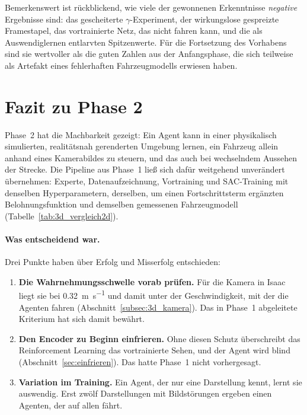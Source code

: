 Bemerkenswert ist rückblickend, wie viele der gewonnenen Erkenntnisse \emph{negative} Ergebnisse sind: das gescheiterte $\gamma$-Experiment, der wirkungslose gespreizte Framestapel, das vortrainierte Netz, das nicht fahren kann, und die als Auswendiglernen entlarvten Spitzenwerte. Für die Fortsetzung des Vorhabens sind sie wertvoller als die guten Zahlen aus der Anfangsphase, die sich teilweise als Artefakt eines fehlerhaften Fahrzeugmodells erwiesen haben.

\section{Fazit zu Phase 2}
\label{sec:fazit_phase2}

Phase~2 hat die Machbarkeit gezeigt: Ein Agent kann in einer physikalisch simulierten, realitätsnah gerenderten Umgebung lernen, ein Fahrzeug allein anhand eines Kamerabildes zu steuern, und das auch bei wechselndem Aussehen der Strecke. Die Pipeline aus Phase~1 ließ sich dafür weitgehend unverändert übernehmen: Experte, Datenaufzeichnung, Vortraining und \ac{SAC}-Training mit denselben Hyperparametern, derselben, um einen Fortschrittsterm ergänzten Belohnungsfunktion und demselben gemessenen Fahrzeugmodell (Tabelle~\ref{tab:3d_vergleich2d}).

\paragraph{Was entscheidend war.}
Drei Punkte haben über Erfolg und Misserfolg entschieden:

\begin{enumerate}
  \item \textbf{Die Wahrnehmungsschwelle vorab prüfen.} Für die Kamera in Isaac liegt sie bei \SI{0.32}{\meter\per\second} und damit unter der Geschwindigkeit, mit der die Agenten fahren (Abschnitt~\ref{subsec:3d_kamera}). Das in Phase~1 abgeleitete Kriterium hat sich damit bewährt.
  \item \textbf{Den Encoder zu Beginn einfrieren.} Ohne diesen Schutz überschreibt das Reinforcement Learning das vortrainierte Sehen, und der Agent wird blind (Abschnitt~\ref{sec:einfrieren}). Das hatte Phase~1 nicht vorhergesagt.
  \item \textbf{Variation im Training.} Ein Agent, der nur eine Darstellung kennt, lernt sie auswendig. Erst zwölf Darstellungen mit Bildstörungen ergeben einen Agenten, der auf allen fährt.
\end{enumerate}

